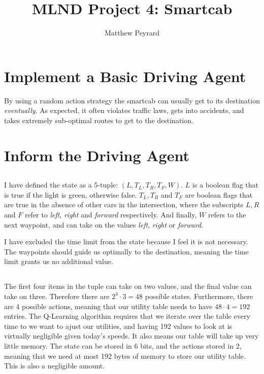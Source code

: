 \documentclass[12pt]{article}
\begin{document}
\title{MLND Project 4: Smartcab}
\author{Matthew Peyrard}
\maketitle

\section{Implement a Basic Driving Agent}
By using a random action strategy the smartcab can usually get to its destination \emph{eventually}. As expected, it often violates traffic laws, gets into accidents, and takes extremely sub-optimal routes to get to the destination.

\section{Inform the Driving Agent}
\subsection{}
I have defined the state as a 5-tuple: $(L, T_L, T_R, T_F, W)$. 
$L$ is a boolean flag that is true if the light is green, otherwise false.
$T_L, T_R$ and $T_F$ are boolean flags that are true in the absence of other cars in the intersection, where the subscripts $L, R$ and $F$ refer to \emph{left}, \emph{right} and \emph{forward} respectively.
And finally, $W$ refers to the next waypoint, and can take on the values \emph{left}, \emph{right} or \emph{forward}.

I have excluded the time limit from the state because I feel it is not necessary. 
The waypoints should guide us optimally to the destination, meaning the time limit grants us no additional value.

\subsection{}
The first four items in the tuple can take on two values, and the final value can take on three. Therefore there are $2^4 \cdot 3 = 48$ possible states.
Furthermore, there are 4 possible actions, meaning that our utility table needs to have $48 \cdot 4 = 192$ entries.
The Q-Learning algorithm requires that we iterate over the table every time to we want to ajust our utilities, and having 192 values to look at is virtually negligible given today's speeds.
It also means our table will take up very little memory. 
The state can be stored in 6 bits, and the actions stored in 2, meaning that we need at most 192 bytes of memory to store our utility table.
This is also a negligible amount.
\end{document}
